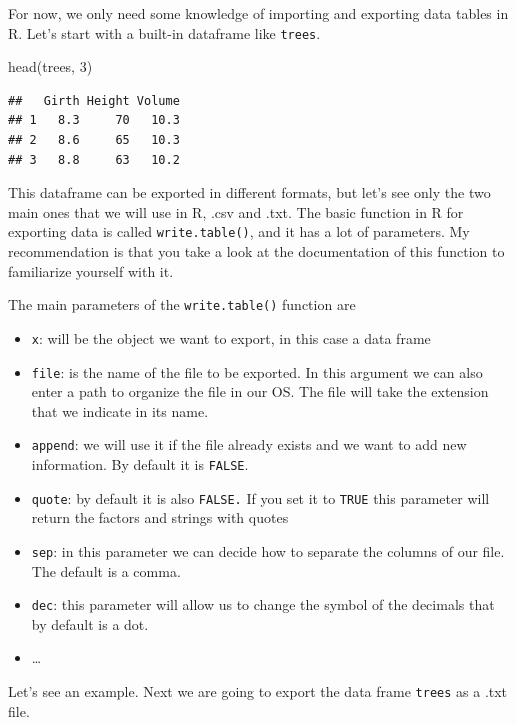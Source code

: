 \documentclass[
]{book}
\newenvironment{Shaded}{\begin{snugshade}}{\end{snugshade}}
\newcommand{\DecValTok}[1]{\textcolor[rgb]{0.00,0.00,0.81}{#1}}
\newcommand{\FunctionTok}[1]{\textcolor[rgb]{0.00,0.00,0.00}{#1}}
\newcommand{\NormalTok}[1]{#1}
\providecommand{\tightlist}{%
  \setlength{\itemsep}{0pt}\setlength{\parskip}{0pt}}
\theoremstyle{definition}
\theoremstyle{definition}
\theoremstyle{definition}
\theoremstyle{definition}
\theoremstyle{remark}
\begin{document}
For now, we only need some knowledge of importing and exporting data tables in R. Let's start with a built-in dataframe like \texttt{trees}.

\begin{Shaded}
\begin{Highlighting}[]
\FunctionTok{head}\NormalTok{(trees, }\DecValTok{3}\NormalTok{)}
\end{Highlighting}
\end{Shaded}

\begin{verbatim}
##   Girth Height Volume
## 1   8.3     70   10.3
## 2   8.6     65   10.3
## 3   8.8     63   10.2
\end{verbatim}

This dataframe can be exported in different formats, but let's see only the two main ones that we will use in R, .csv and .txt. The basic function in R for exporting data is called \texttt{write.table()}, and it has a lot of parameters. My recommendation is that you take a look at the documentation of this function to familiarize yourself with it.

The main parameters of the \texttt{write.table()} function are

\begin{itemize}
\tightlist
\item
  \texttt{x}: will be the object we want to export, in this case a data frame
\item
  \texttt{file}: is the name of the file to be exported. In this argument we can also enter a path to organize the file in our OS. The file will take the extension that we indicate in its name.
\item
  \texttt{append}: we will use it if the file already exists and we want to add new information. By default it is \texttt{FALSE}.
\item
  \texttt{quote}: by default it is also \texttt{FALSE.} If you set it to \texttt{TRUE} this parameter will return the factors and strings with quotes
\item
  \texttt{sep}: in this parameter we can decide how to separate the columns of our file. The default is a comma.
\item
  \texttt{dec}: this parameter will allow us to change the symbol of the decimals that by default is a dot.
\item
  \ldots{}
\end{itemize}

Let's see an example. Next we are going to export the data frame \texttt{trees} as a .txt file.
\end{document}

